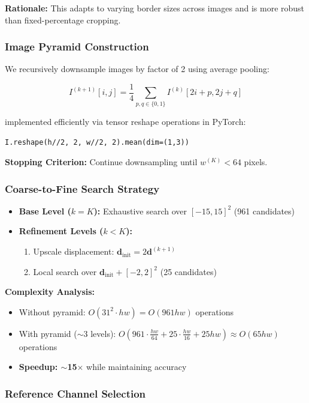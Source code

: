 \documentclass[11pt]{article}
\begin{document}
\textbf{Rationale:} This adapts to varying border sizes across images and is more robust than fixed-percentage cropping.

\subsubsection{Image Pyramid Construction}

We recursively downsample images by factor of 2 using average pooling:

\begin{equation}
I^{(k+1)}[i,j] = \frac{1}{4}\sum_{p,q \in \{0,1\}} I^{(k)}[2i+p, 2j+q]
\end{equation}

implemented efficiently via tensor reshape operations in PyTorch:

\texttt{I.reshape(h//2, 2, w//2, 2).mean(dim=(1,3))}

\textbf{Stopping Criterion:} Continue downsampling until $w^{(K)} < 64$ pixels.

\subsubsection{Coarse-to-Fine Search Strategy}

\begin{itemize}
\item \textbf{Base Level ($k=K$):} Exhaustive search over $[-15, 15]^2$ (961 candidates)
\item \textbf{Refinement Levels ($k < K$):} 
\begin{enumerate}
\item Upscale displacement: $\mathbf{d}_{\text{init}} = 2\mathbf{d}^{(k+1)}$
\item Local search over $\mathbf{d}_{\text{init}} + [-2, 2]^2$ (25 candidates)
\end{enumerate}
\end{itemize}

\textbf{Complexity Analysis:}
\begin{itemize}
\item Without pyramid: $O(31^2 \cdot hw) = O(961hw)$ operations
\item With pyramid ($\sim$3 levels): $O(961 \cdot \frac{hw}{64} + 25 \cdot \frac{hw}{16} + 25hw) \approx O(65hw)$ operations
\item \textbf{Speedup: $\sim$15$\times$} while maintaining accuracy
\end{itemize}

\subsubsection{Reference Channel Selection}
\end{document}
